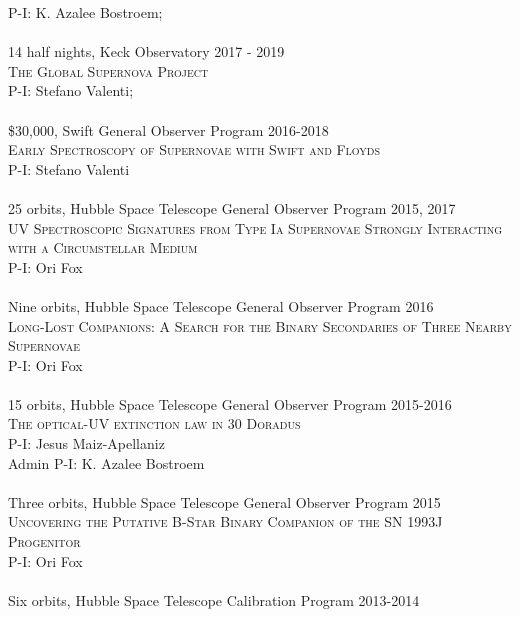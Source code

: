 \documentclass[10pt]{cv}
\begin{document}
\begin{llist}
P-I: K. Azalee Bostroem; \\
\\
14 half nights, Keck Observatory \hfill 2017 - 2019\\
\textsc{The Global Supernova Project}\\
P-I: Stefano Valenti; \\
\\
\$30,000, Swift General Observer Program \hfill 2016-2018 \\
\textsc{Early Spectroscopy of Supernovae with Swift and Floyds}\\
P-I: Stefano Valenti \\
\\
25 orbits, Hubble Space Telescope General Observer Program \hfill 2015, 2017\\ %
\textsc{UV Spectroscopic Signatures from Type Ia Supernovae Strongly Interacting with a Circumstellar Medium}\\
P-I: Ori Fox \\
\\
Nine orbits, Hubble Space Telescope General Observer Program \hfill 2016\\ %
\textsc{Long-Lost Companions: A Search for the Binary Secondaries of Three Nearby Supernovae}\\
P-I: Ori Fox \\
\\
15 orbits, Hubble Space Telescope General Observer Program \hfill \hfill 2015-2016\\ %
\textsc{The optical-UV extinction law in 30 Doradus}\\
P-I: Jesus Maiz-Apellaniz \\
Admin P-I: K. Azalee Bostroem \\
\\
Three orbits, Hubble Space Telescope General Observer Program \hfill 2015\\ %
\textsc{Uncovering the Putative B-Star Binary Companion of the SN 1993J Progenitor}\\
P-I: Ori Fox \\
\\
Six orbits, Hubble Space Telescope Calibration Program \hfill 2013-2014\\ %

\end{llist}
\end{document}
